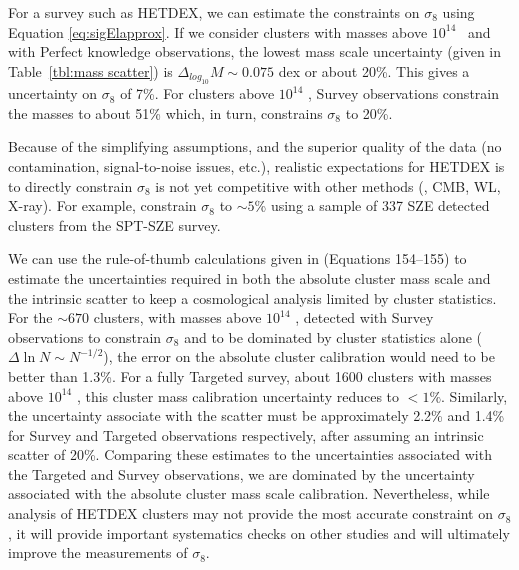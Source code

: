 \documentclass[fleqn,usenatbib]{mnras}
\begin{document}
For a survey such as HETDEX, we can estimate the constraints on $\sigma_8$ using Equation \ref{eq:sigElapprox}. If we consider clusters with masses above $10^{14}$ \Msol\ and with Perfect knowledge observations, the lowest mass scale uncertainty (given in Table~\ref{tbl:mass scatter}) is $\Delta_{log_{10}}M \sim 0.075$ dex or about 20\%. This gives a uncertainty on $\sigma_8$ of 7\%. For clusters above $10^{14}$ \Msol, Survey observations constrain the masses to about 51\% which, in turn, constrains $\sigma_8$ to 20\%. 

Because of the simplifying assumptions, and the superior quality of the data (no contamination, signal-to-noise issues, etc.), realistic expectations for HETDEX is to directly constrain $\sigma_8$ is not yet competitive with other methods (\eg, CMB, WL, X-ray). For example, \cite{DeHaan2016} constrain $\sigma_8$ to $\sim5$\% using a sample of 337 SZE detected clusters from the SPT-SZE survey. 

We can use the rule-of-thumb calculations given in  (Equations 154--155) to estimate the uncertainties required in both the absolute cluster mass scale and the intrinsic scatter to keep a cosmological analysis limited by cluster statistics. For the $\sim670$ clusters, with masses above $10^{14}$ \Msol, detected with Survey observations to constrain $\sigma_8$ and to be dominated by cluster statistics alone ($\Delta \ln N \sim N^{-1/2}$), the error on the  absolute cluster calibration would need to be better than 1.3\%. For a fully Targeted survey, about 1600 clusters with masses above $10^{14}$ \Msol, this cluster mass calibration uncertainty reduces to $<1\%$. Similarly, the uncertainty associate with the scatter must be approximately 2.2\% and 1.4\% for Survey and Targeted observations respectively, after assuming an intrinsic scatter of 20\%. Comparing these estimates to the uncertainties associated with the Targeted and Survey observations, we are dominated by the uncertainty associated with the absolute cluster mass scale calibration. Nevertheless, while analysis of HETDEX clusters may not provide the most accurate constraint on $\sigma_8$, it will provide important systematics checks on other studies and will ultimately improve the measurements of $\sigma_8$.
\end{document}
